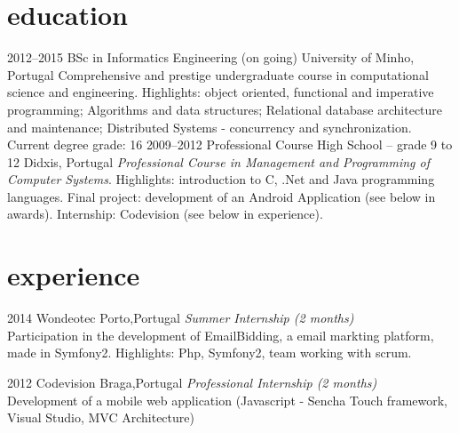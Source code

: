 \documentclass[]{friggeri-cv} %
\begin{document}
\section{education}

\begin{entrylist}
\entry
{2012--2015}
{BSc in Informatics Engineering  {\normalfont (on going) }}
{University of Minho, Portugal}
{Comprehensive and prestige undergraduate course in computational science and engineering. Highlights: object oriented, functional and imperative programming; Algorithms and data structures; Relational database architecture and maintenance; Distributed Systems - concurrency and synchronization. Current degree grade: 16 }
\entry
{2009--2012}
{Professional Course {\normalfont High School – grade 9 to 12}}
{Didxis, Portugal}
{\emph{Professional Course in Management and Programming of Computer Systems}. Highlights: introduction to C, .Net and Java programming languages. Final project: development of an Android Application (see below in awards). Internship: Codevision (see below in experience).}

\end{entrylist}

\section{experience}

\begin{entrylist}
\entry
{2014}
{Wondeotec}
{Porto,Portugal}
{\emph{Summer Internship (2 months)} \\
Participation in the development of EmailBidding, a email markting platform, made in Symfony2. Highlights: Php, Symfony2, team working with scrum.
}

\entry
{2012}
{Codevision}
{Braga,Portugal}
{\emph{Professional Internship (2 months)} \\
Development of a mobile web application (Javascript - Sencha Touch framework, Visual Studio, MVC Architecture) 
}
\end{entrylist}

\end{document}
